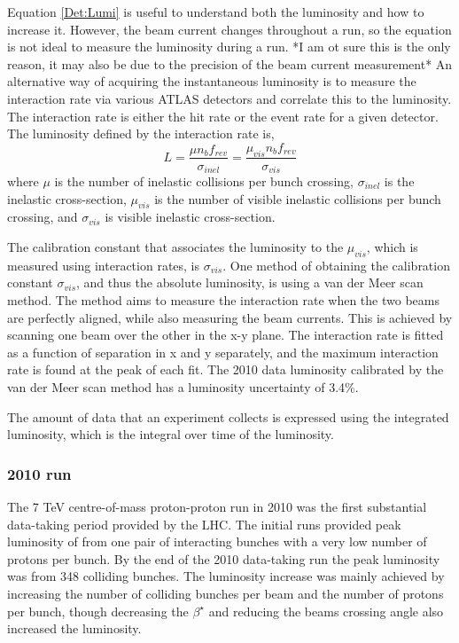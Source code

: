 Equation \ref{Det:Lumi} is useful to understand both the luminosity and how to increase it. 
However, the beam current changes throughout a run, so the equation is not ideal to measure the luminosity during a run.
*I am ot sure this is the only reason, it may also be due to the precision of the beam current measurement* 
An alternative way of acquiring the instantaneous luminosity is to measure the interaction rate via various ATLAS detectors and correlate this to the luminosity. 
The interaction rate is either the hit rate or the event rate for a given detector.
The luminosity defined by the interaction rate is,
\begin{equation}
L=\frac{\mu n_bf_{rev}}{\sigma_{inel}}=\frac{\mu_{vis}n_bf_{rev}}{\sigma_{vis}}
\label{Det:Lumi2}
\end{equation}
where $\mu$ is the number of inelastic collisions per bunch crossing, $\sigma_{inel}$ is the inelastic cross-section, $\mu_{vis}$ is the number of visible inelastic collisions per bunch crossing, and $\sigma_{vis}$ is visible inelastic cross-section. 


The calibration constant that associates the luminosity to the $\mu_{vis}$, which is measured using interaction rates, is $\sigma_{vis}$.
One method of obtaining the calibration constant $\sigma_{vis}$, and thus the absolute luminosity, is using a van der Meer scan method.
The method aims to measure the interaction rate when the two beams are perfectly aligned, while also measuring the beam currents.
This is achieved by scanning one beam over the other in the x-y plane. 
The interaction rate is fitted as a function of separation in x and y separately, and the maximum interaction rate is found at the peak of each fit. 
The 2010 data luminosity calibrated by the van der Meer scan method has a luminosity uncertainty of 3.4\%.

The amount of data that an experiment collects is expressed using the integrated luminosity, which is the integral over time of the luminosity.

\subsubsection{2010 run}
The 7 TeV centre-of-mass proton-proton run in 2010 was the first substantial data-taking period provided by the LHC. 
The initial runs provided peak luminosity of  from one pair of interacting bunches with a very low number of protons per bunch. 
By the end of the 2010 data-taking run the peak luminosity was  from 348 colliding bunches.
The luminosity increase was mainly achieved by increasing the number of colliding bunches per beam and the number of protons per bunch, though decreasing the $\beta^\star$ and reducing the beams crossing angle also increased the luminosity.


